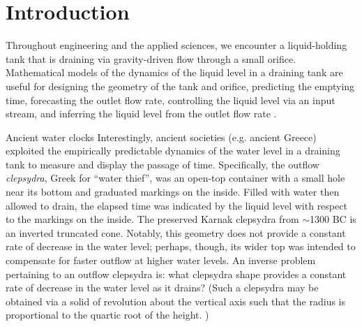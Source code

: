 \documentclass[openacc]{rsproca_new}%
\begin{document}
\rsbreak


\section{Introduction}
Throughout engineering and the applied sciences, we encounter a liquid-holding tank that is draining via gravity-driven flow through a small orifice.
Mathematical models of the dynamics of the liquid level in a draining tank are useful for designing the geometry of the tank and orifice, predicting the emptying time, forecasting the outlet flow rate, controlling the liquid level via an input stream, and inferring the liquid level from the outlet flow rate \cite{d2021torricelli,seborg2016process,groetsch1993inverse,groetsch1999inverse}.

\begin{mytcbox}[label=box:waterclocks, breakable]{Ancient water clocks}
Interestingly, ancient societies (e.g. ancient Greece) exploited the empirically predictable dynamics of the water level in a draining tank to measure and display the passage of time.
Specifically, the outflow \emph{clepsydra}, Greek for ``water thief'', was an open-top container with a small hole near its bottom and graduated markings on the inside. 
Filled with water then allowed to drain, the elapsed time was indicated by the liquid level with respect to the markings on the inside. \cite{bedini1962compartmented,hwang2021historical,ritner2016oriental,hejun1987research,schomberg2018karnak,mills1982newton}
The preserved Karnak clepsydra from $\sim$1300 BC \cite{schomberg2018karnak} is an inverted truncated cone. Notably, this geometry does not provide a constant rate of decrease in the water level; perhaps, though, its wider top was intended to compensate for faster outflow at higher water levels. An inverse problem pertaining to an outflow clepsydra is: what clepsydra shape provides a constant rate of decrease in the water level as it drains?
(Such a clepsydra may be obtained via a solid of revolution about the vertical axis such that the radius is proportional to the quartic root of the height. \cite{mills1982newton,d2021torricelli})
\end{mytcbox}
\end{document}
